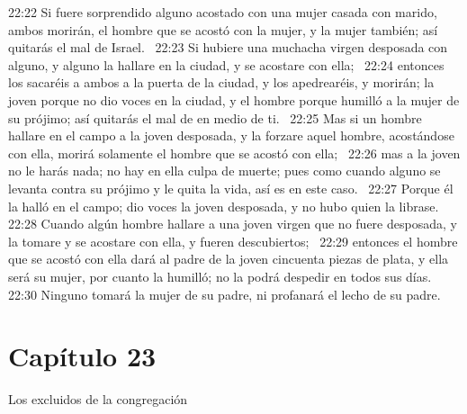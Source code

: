 22:22 Si fuere sorprendido alguno acostado con una mujer casada con marido, ambos morirán, el hombre que se acostó con la mujer, y la mujer también; así quitarás el mal de Israel.  
22:23 Si hubiere una muchacha virgen desposada con alguno, y alguno la hallare en la ciudad, y se acostare con ella;  
22:24 entonces los sacaréis a ambos a la puerta de la ciudad, y los apedrearéis, y morirán; la joven porque no dio voces en la ciudad, y el hombre porque humilló a la mujer de su prójimo; así quitarás el mal de en medio de ti.  
22:25 Mas si un hombre hallare en el campo a la joven desposada, y la forzare aquel hombre, acostándose con ella, morirá solamente el hombre que se acostó con ella;  
22:26 mas a la joven no le harás nada; no hay en ella culpa de muerte; pues como cuando alguno se levanta contra su prójimo y le quita la vida, así es en este caso.  
22:27 Porque él la halló en el campo; dio voces la joven desposada, y no hubo quien la librase.  
22:28 Cuando algún hombre hallare a una joven virgen que no fuere desposada, y la tomare y se acostare con ella, y fueren descubiertos;  
22:29 entonces el hombre que se acostó con ella dará al padre de la joven cincuenta piezas de plata, y ella será su mujer, por cuanto la humilló; no la podrá despedir en todos sus días. 
22:30 Ninguno tomará la mujer de su padre, ni profanará el lecho de su padre.  
\section*{Capítulo 23 }
Los excluidos de la congregación  

